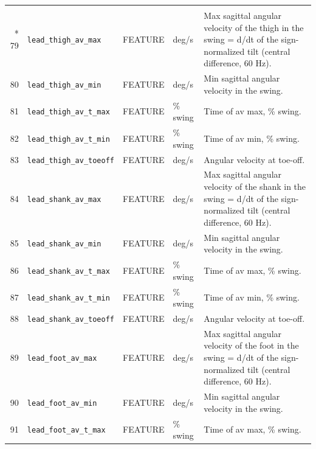 \begin{longtable}{@{}r p{3.6cm} p{1.55cm} p{1.15cm} p{8.6cm}@{}}
\addlinespace
\multicolumn{5}{@{}l}{\textbf{Segment angular velocity over the swing (Dot) (30)}} \\*
79 & \texttt{lead\_\allowbreak{}thigh\_\allowbreak{}av\_\allowbreak{}max} & FEATURE & deg/s & Max sagittal angular velocity of the thigh in the swing = d/dt of the sign-normalized tilt (central difference, 60 Hz). \\
80 & \texttt{lead\_\allowbreak{}thigh\_\allowbreak{}av\_\allowbreak{}min} & FEATURE & deg/s & Min sagittal angular velocity in the swing. \\
81 & \texttt{lead\_\allowbreak{}thigh\_\allowbreak{}av\_\allowbreak{}t\_\allowbreak{}max} & FEATURE & \% swing & Time of av max, \% swing. \\
82 & \texttt{lead\_\allowbreak{}thigh\_\allowbreak{}av\_\allowbreak{}t\_\allowbreak{}min} & FEATURE & \% swing & Time of av min, \% swing. \\
83 & \texttt{lead\_\allowbreak{}thigh\_\allowbreak{}av\_\allowbreak{}toeoff} & FEATURE & deg/s & Angular velocity at toe-off. \\
84 & \texttt{lead\_\allowbreak{}shank\_\allowbreak{}av\_\allowbreak{}max} & FEATURE & deg/s & Max sagittal angular velocity of the shank in the swing = d/dt of the sign-normalized tilt (central difference, 60 Hz). \\
85 & \texttt{lead\_\allowbreak{}shank\_\allowbreak{}av\_\allowbreak{}min} & FEATURE & deg/s & Min sagittal angular velocity in the swing. \\
86 & \texttt{lead\_\allowbreak{}shank\_\allowbreak{}av\_\allowbreak{}t\_\allowbreak{}max} & FEATURE & \% swing & Time of av max, \% swing. \\
87 & \texttt{lead\_\allowbreak{}shank\_\allowbreak{}av\_\allowbreak{}t\_\allowbreak{}min} & FEATURE & \% swing & Time of av min, \% swing. \\
88 & \texttt{lead\_\allowbreak{}shank\_\allowbreak{}av\_\allowbreak{}toeoff} & FEATURE & deg/s & Angular velocity at toe-off. \\
89 & \texttt{lead\_\allowbreak{}foot\_\allowbreak{}av\_\allowbreak{}max} & FEATURE & deg/s & Max sagittal angular velocity of the foot in the swing = d/dt of the sign-normalized tilt (central difference, 60 Hz). \\
90 & \texttt{lead\_\allowbreak{}foot\_\allowbreak{}av\_\allowbreak{}min} & FEATURE & deg/s & Min sagittal angular velocity in the swing. \\
91 & \texttt{lead\_\allowbreak{}foot\_\allowbreak{}av\_\allowbreak{}t\_\allowbreak{}max} & FEATURE & \% swing & Time of av max, \% swing. \\

\end{longtable}
